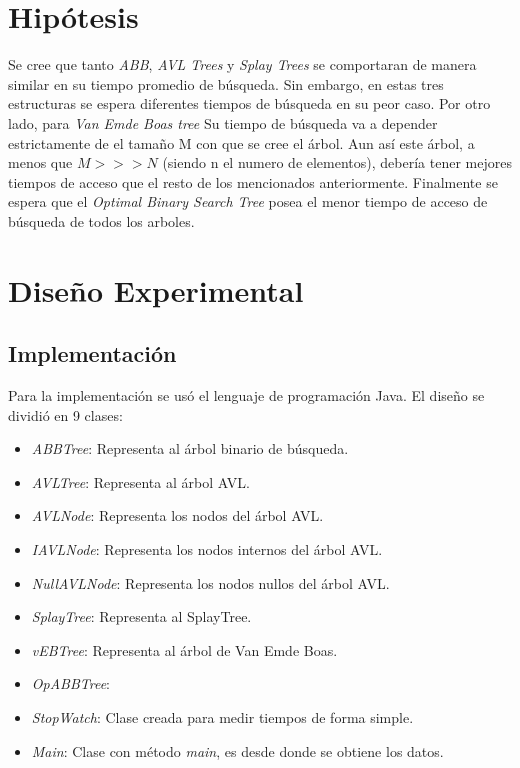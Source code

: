 \documentclass[letterpaper,12pt]{article}
\begin{document}
\section{Hipótesis}
Se cree que tanto \textit{ABB}, \textit{AVL Trees} y \textit{Splay Trees} se comportaran de manera similar en su tiempo promedio de búsqueda. Sin embargo, en estas tres estructuras se espera diferentes tiempos de búsqueda en su peor caso. Por otro lado, para \textit{Van Emde Boas tree} Su tiempo de búsqueda va a depender estrictamente de el tamaño M con que se cree el árbol. Aun así este árbol, a menos que $M>>>N$ (siendo n el numero de elementos), debería tener mejores tiempos de acceso que el resto de los mencionados anteriormente. Finalmente se espera que el \textit{Optimal Binary Search Tree} posea el menor tiempo de acceso de búsqueda de todos los arboles.

\newpage
\section{Dise\~no Experimental}
\subsection{Implementaci\'on}
Para la implementaci\'on se us\'o el lenguaje de programaci\'on Java. El dise\~no se dividi\'o en 9 clases:

\begin{itemize}
\item \textit{ABBTree}: Representa al árbol binario de búsqueda.
\item \textit{AVLTree}: Representa al árbol AVL.
\item \textit{AVLNode}: Representa los nodos del árbol AVL.
\item \textit{IAVLNode}: Representa los nodos internos del árbol AVL.
\item \textit{NullAVLNode}: Representa los nodos nullos del árbol AVL.
\item \textit{SplayTree}: Representa al SplayTree.
\item \textit{vEBTree}: Representa al árbol de Van Emde Boas.
\item \textit{OpABBTree}:

\item \textit{StopWatch}: Clase creada para medir tiempos de forma simple.
\item \textit{Main}: Clase con m\'etodo \textit{main}, es desde donde se obtiene los datos.
\end{itemize}
\end{document}
